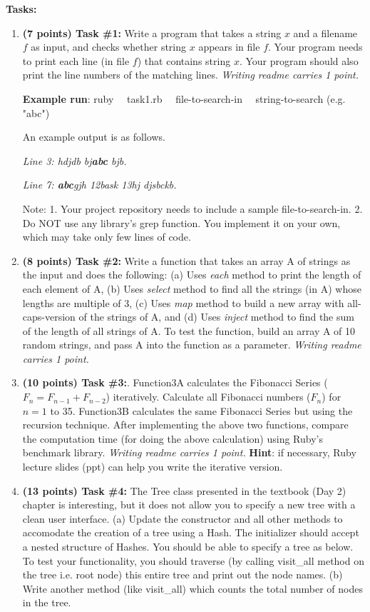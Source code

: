 \documentclass[paper=letter, fontsize=11pt]{scrartcl} %
\begin{document}
    \textbf{Tasks:}
    \begin{enumerate}[noitemsep]
        \item \textbf{(7 points) Task \#1:} Write a program that takes a string $x$ 
and a filename $f$ as input, and checks whether string $x$ appears in file $f$. Your 
program needs to print each line (in file $f$) that contains string $x$. 
Your program should also print the line numbers of the matching lines.
\emph{Writing readme carries 1 point.}

\textbf{Example run}: ruby $~~~$  task1.rb $~~~$ file-to-search-in $~~~$  string-to-search (e.g. "abc")

An example output is as follows.

\emph{Line 3: hdjdb bj\textbf{abc} bjb.}

\emph{Line 7: \textbf{abc}gjh 12bask 13hj djsbckb.} 


Note: 1. Your project repository needs to include a sample file-to-search-in. 2. Do NOT use any library's grep function. You implement it on your own, which may take only few lines of code.
      
  \item \textbf{(8 points) Task \#2:} Write a function that takes an array A of strings as the input 
and does the following: (a) Uses \emph{each} method to print the length of each element of A, 
(b) Uses \emph{select} method to find all the strings (in A) whose lengths are multiple of 3, 
(c) Uses \emph{map} method to build a new array with all-caps-version of the strings of A, 
and (d) Uses \emph{inject} method to find the sum of the length of all strings of A.
To test the function, build an array A of 10 random strings, 
and pass A into the function as a parameter.
\emph{Writing readme carries 1 point.}
        \item \textbf{(10 points) Task \#3:}. Function3A calculates the Fibonacci Series ($F_n = F_{n-1} + F_{n-2}$) iteratively. 
Calculate all Fibonacci numbers ($F_n$) for $n=1$ to 35. 
Function3B calculates the same Fibonacci Series but using the recursion technique. 
After implementing the above two functions, compare the computation time (for doing the above calculation) 
using Ruby's benchmark library. \emph{Writing readme carries 1 point.}
\textbf{Hint}: if necessary, Ruby lecture slides (ppt) can help you write the iterative version.
        \item \textbf{(13 points) Task \#4:} The Tree class presented in the textbook (Day 2) chapter is interesting, but it does not allow 
you to specify a new tree with a clean user interface. (a) Update the constructor and all other methods to accomodate the creation of a tree using a Hash. 
The initializer should accept a nested structure of Hashes. You should be able to specify a tree as below. To test your functionality, you should traverse (by calling visit\_all method on the tree i.e. root node) this entire tree and print out the node names. (b) Write another method (like visit\_all) which counts the total number of nodes in the tree.


\end{enumerate}
\end{document}
